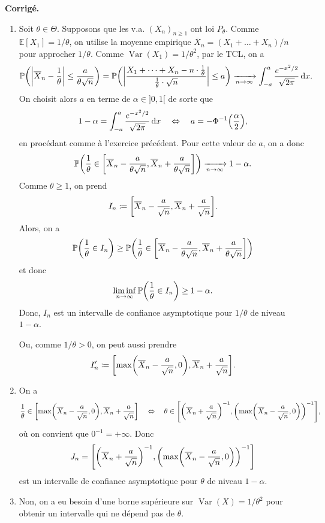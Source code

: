 \documentclass[a4paper,11pt]{article}
\let\originalleft\left
\let\originalright\right
\renewcommand{\left}{\mathopen{}\mathclose\bgroup\originalleft}
\renewcommand{\right}{\aftergroup\egroup\originalright}
\newcommand{\E}{\mathbb{E}}
\newcommand{\1}{\mathbbm{1}}
\newcommand{\Pp}[1]{\mathbb{P} \left(#1\right)}
\newcommand{\diff}{\mathop{}\mathopen{}\mathrm{d}}
\DeclareMathOperator{\Var}{Var}
\newcommand{\abs}[1]{\left\lvert#1\right\rvert}
\theoremstyle{plain}
\theoremstyle{definition}
\renewenvironment{comment}{\medskip\noindent \textcolor{BrickRed}{\textbf{Corrigé.}}}{}
\begin{document}
\begin{comment}
\begin{enumerate}
	\item Soit $\theta \in \Theta$. Supposons que les v.a. $(X_n)_{n\geq 1}$ ont loi $P_\theta$. Comme $\E[X_1] = 1/\theta$, on utilise la moyenne empirique $\overline{X}_n = (X_1+\dots+X_n)/n$ pour approcher $1/\theta$.
	Comme $\Var(X_1) = 1/\theta^2$, par le TCL, on a
	\[
	\Pp{\abs{\overline{X}_n - \frac{1}{\theta}} \leq \frac{a}{\theta\sqrt{n}}}
	= \Pp{ \abs{\frac{X_1+\dots+X_n - n\cdot\frac{1}{\theta}}{\frac{1}{\theta} \cdot \sqrt{n}} } \leq a}
	\xrightarrow[n\to\infty]{} 
	\int_{-a}^a \frac{e^{-x^2/2}}{\sqrt{2\pi}} \diff x.
	\]
	On choisit alors $a$ en terme de $\alpha \in {]}0,1{[}$ de sorte que 
	\[
	1- \alpha = \int_{-a}^a \frac{e^{-x^2/2}}{\sqrt{2\pi}} \diff x
	\quad \Leftrightarrow \quad
	a = - \Phi^{-1} \left( \frac{\alpha}{2} \right),
	\]
	en procédant comme à l'exercice précédent.
	Pour cette valeur de $a$, on a donc
	\[
	\Pp{\frac{1}{\theta} \in 
		\left[ \overline{X}_n - \frac{a}{\theta \sqrt{n}},
		\overline{X}_n + \frac{a}{\theta \sqrt{n}} \right]}
	\xrightarrow[n\to\infty]{} 1-\alpha.
	\]
	Comme $\theta \geq 1$, on prend
	\[
	I_n \coloneqq \left[ \overline{X}_n - \frac{a}{\sqrt{n}},
	\overline{X}_n + \frac{a}{\sqrt{n}} \right].
	\]
	Alors, on a 
	\[
	\Pp{\frac{1}{\theta} \in I_n}
	\geq \Pp{\frac{1}{\theta} \in 
		\left[ \overline{X}_n - \frac{a}{\theta \sqrt{n}},
		\overline{X}_n + \frac{a}{\theta \sqrt{n}} \right]}
	\]
	et donc
	\[
	\liminf_{n\to\infty} \Pp{\frac{1}{\theta} \in I_n} \geq 1-\alpha.
	\]
	Donc, $I_n$ est un intervalle de confiance asymptotique pour $1/\theta$ de niveau $1-\alpha$.
	
	Ou, comme $1/\theta > 0$, on peut aussi prendre 
	\[
	I_n' \coloneqq \left[ \max \left( \overline{X}_n - \frac{a}{\sqrt{n}}, 0 \right),
	\overline{X}_n + \frac{a}{\sqrt{n}} \right].
	\]
	\item On a 
	\[
	\frac{1}{\theta} \in 
	\left[ \max \left( \overline{X}_n - \frac{a}{\sqrt{n}}, 0 \right),
	\overline{X}_n + \frac{a}{\sqrt{n}} \right]
	\quad \Leftrightarrow \quad 
	\theta \in 
	\left[ \left( \overline{X}_n + \frac{a}{\sqrt{n}} \right)^{-1},
	\left( \max \left( \overline{X}_n - \frac{a}{\sqrt{n}}, 0 \right) \right)^{-1} \right],
	\]
	où on convient que $0^{-1} = + \infty$.
	Donc
	\[
		J_n = \left[ \left( \overline{X}_n + \frac{a}{\sqrt{n}} \right)^{-1},
		\left( \max \left( \overline{X}_n - \frac{a}{\sqrt{n}}, 0 \right) \right)^{-1} \right]
	\]
	est un intervalle de confiance asymptotique pour $\theta$ de niveau $1-\alpha$.
	\item Non, on a eu besoin d'une borne supérieure sur $\Var(X) = 1/\theta^2$ pour obtenir un intervalle qui ne dépend pas de $\theta$.
\end{enumerate}
\end{comment}
\end{document}
